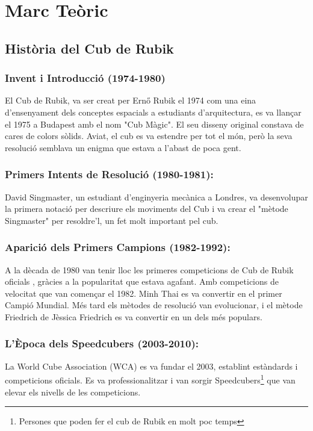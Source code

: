 \pagestyle{normal}
\part{Marc Teòric}
\chapter{Història del Cub de Rubik}

\section{Invent i Introducció (1974-1980)}

El Cub de Rubik, va ser creat per Ernő Rubik el 1974 com una eina d'ensenyament dels
conceptes espacials a estudiants d'arquitectura, es va llançar el 1975 a Budapest amb el nom
"Cub Màgic". El seu disseny original constava de cares de colors sòlids. Aviat, el cub es va estendre per tot el món, però la seva resolució semblava un enigma que estava
a l'abast de poca gent. \cite{Insider} \cite{ross_rubiks}

\section{Primers Intents de Resolució (1980-1981):}

David Singmaster, un estudiant d'enginyeria mecànica a Londres, va desenvolupar la primera notació per descriure els moviments del Cub i va crear el "mètode Singmaster" per resoldre'l,
un fet molt important pel cub. \cite{DavidSingmaster}

\section{Aparició dels Primers Campions (1982-1992):}

A la dècada de 1980 van tenir lloc les primeres competicions de Cub de Rubik oficials , gràcies a
la popularitat que estava agafant. Amb competicions de velocitat que van començar el 1982.
Minh Thai es va convertir en el primer Campió Mundial. Més tard els mètodes de resolució van
evolucionar, i el mètode Friedrich de Jèssica Friedrich es va convertir en un dels més populars.

\section{L'Època dels Speedcubers (2003-2010):}

La World Cube Association (WCA) es va fundar el 2003, establint estàndards i competicions oficials. Es va professionalitzar i van sorgir Speedcubers\footnote{Persones que poden fer el cub de Rubik en molt poc temps} que van elevar els nivells de les competicions.

